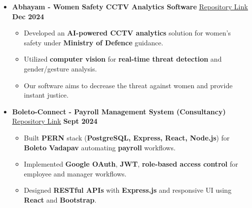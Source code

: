 \documentclass[letterpaper,10pt]{article}
\begin{document}
\begin{itemize}[leftmargin=*,label=\textbullet, noitemsep, topsep=0pt, partopsep=0pt]
    \item \textbf{Abhayam - Women Safety CCTV Analytics Software} \quad \href{https://github.com/AdiSinghCodes/Abhayam-Women-Safety-CCTV-Analytics-Software.git}{\underline{Repository Link}} \hfill \textbf{Dec 2024}
    \begin{itemize}[leftmargin=0.75cm,label=$\circ$, noitemsep, topsep=0pt, partopsep=0pt]
        \item Developed an \textbf{AI-powered CCTV analytics} solution for women's safety under \textbf{Ministry of Defence} guidance.
        \item Utilized \textbf{computer vision} for \textbf{real-time threat detection} and gender/gesture analysis.
        \item Our software aims to decrease the threat against women and provide instant justice.
    \end{itemize}

    \vspace{1pt}

    \item \textbf{Boleto-Connect - Payroll Management System (Consultancy)} \quad \href{https://github.com/AdiSinghCodes/Boleto-Connect.git}{\underline{Repository Link}} \hfill \textbf{Sept 2024}
    \begin{itemize}[leftmargin=0.75cm,label=$\circ$, noitemsep, topsep=0pt, partopsep=0pt]
        \item Built \textbf{PERN} stack (\textbf{PostgreSQL, Express, React, Node.js}) for \textbf{Boleto Vadapav} automating \textbf{payroll} workflows.
        \item Implemented \textbf{Google OAuth}, \textbf{JWT}, \textbf{role-based access control} for employee and manager workflows.
        \item Designed \textbf{RESTful APIs} with \textbf{Express.js} and responsive UI using \textbf{React} and \textbf{Bootstrap}.
    \end{itemize}
\end{itemize}
\end{document}
